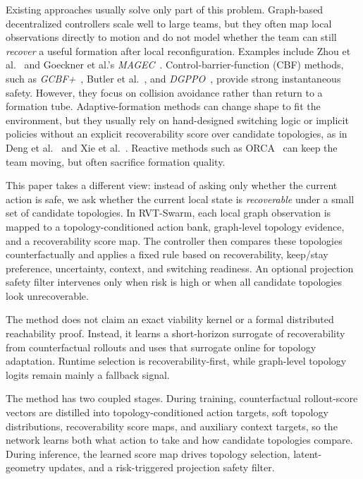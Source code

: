 \documentclass{ieeeaccess}
\begin{document}
Existing approaches usually solve only part of this problem.
Graph-based decentralized controllers scale well to large teams, but
they often map local observations directly to motion and do not model
whether the team can still \emph{recover} a useful formation after
local reconfiguration. Examples include Zhou
et al.~\cite{muthusamy2024gnn_generalizability} and Goeckner
et al.'s \emph{MAGEC}~\cite{goeckner2024magec}. Control-barrier-function
(CBF) methods, such as \emph{GCBF+}~\cite{zhang2025gcbf_plus}, Butler
et al.~\cite{butler2024collaborative_safety}, and
\emph{DGPPO}~\cite{zhang2025dgppo}, provide strong instantaneous safety.
However, they focus on collision avoidance rather than return to a
formation tube. Adaptive-formation methods can change shape to fit the
environment, but they usually rely on hand-designed switching logic or implicit
policies without an explicit recoverability score over candidate
topologies, as in Deng
et al.~\cite{deng2024formation_adaptation} and Xie
et al.~\cite{xie2025multi_uav_formation_rl}. Reactive methods such as
ORCA~\cite{van2011orca} can keep the team moving, but often sacrifice
formation quality.

This paper takes a different view: instead of asking only whether the
current action is safe, we ask whether the current local state is
\emph{recoverable} under a small set of candidate topologies. In
RVT-Swarm, each local graph observation is mapped to a
topology-conditioned action bank, graph-level topology evidence, and a
recoverability score map. The controller then compares these topologies
counterfactually and applies a fixed rule based on recoverability,
keep/stay preference, uncertainty, context, and switching readiness. An
optional projection safety filter intervenes only when risk is high or when
all candidate topologies look unrecoverable.

The method does not claim an exact viability kernel or a formal
distributed reachability proof. Instead, it learns a short-horizon
surrogate of recoverability from counterfactual rollouts and uses that
surrogate online for topology adaptation. Runtime selection is
recoverability-first, while graph-level topology logits remain mainly a
fallback signal.

The method has two coupled stages. During training, counterfactual
rollout-score vectors are distilled into topology-conditioned action
targets, soft topology distributions, recoverability score maps, and
auxiliary context targets, so the network learns both what action to
take and how candidate topologies compare. During inference, the
learned score map drives topology selection, latent-geometry updates,
and a risk-triggered projection safety filter.
\end{document}
